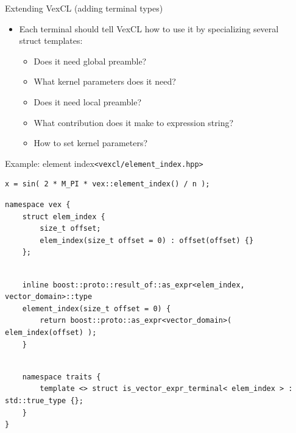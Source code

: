 \documentclass[@BEAMER_OPTIONS@]{beamer}
\newcommand{\code}[1]{\lstinline|#1|}
\begin{document}
\note{ }

\begin{frame}{Extending VexCL (adding terminal types)}
    \begin{itemize}
        \item Each terminal should tell VexCL how to use it by specializing
            several\\ struct templates:
            \begin{itemize}
                \item Does it need global preamble?
                \item What kernel parameters does it need?
                \item Does it need local preamble?
                \item What contribution does it make to expression string?
                \item How to set kernel parameters?
            \end{itemize}
    \end{itemize}
\end{frame}

\note{ }

\begin{frame}[fragile]{Example: element index}{\code{<vexcl/element_index.hpp>}}
    \begin{exampleblock}{}
        \begin{lstlisting}
x = sin( 2 * M_PI * vex::element_index() / n );
        \end{lstlisting}
    \end{exampleblock}
    \pause
    \begin{exampleblock}{}
        \begin{lstlisting}
namespace vex {
    struct elem_index {
        size_t offset;
        elem_index(size_t offset = 0) : offset(offset) {}
    };
        \end{lstlisting}
        \pause
        \begin{lstlisting}[firstnumber=last]

    inline boost::proto::result_of::as_expr<elem_index, vector_domain>::type
    element_index(size_t offset = 0) {
        return boost::proto::as_expr<vector_domain>( elem_index(offset) );
    }
        \end{lstlisting}
        \pause
        \begin{lstlisting}[firstnumber=last]

    namespace traits {
        template <> struct is_vector_expr_terminal< elem_index > : std::true_type {};
    }
}
        \end{lstlisting}
    \end{exampleblock}
\end{frame}
\end{document}
